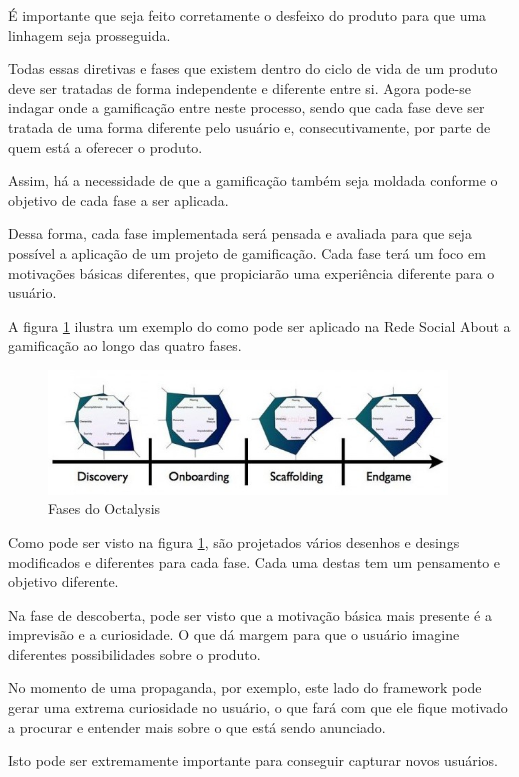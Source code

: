 É importante que seja feito corretamente o desfeixo do produto para que uma linhagem seja
prosseguida.


Todas essas diretivas e fases que existem dentro do ciclo de vida de um produto deve ser
tratadas de forma independente e diferente entre si. Agora pode-se indagar onde a gamificação
entre neste processo, sendo que cada fase deve ser tratada de uma forma diferente pelo
usuário e, consecutivamente, por parte de quem está a oferecer o produto.

Assim, há a necessidade de que a gamificação também seja moldada conforme o objetivo de
cada fase a ser aplicada.

Dessa forma, cada fase implementada será pensada e avaliada para que seja possível a
aplicação de um  projeto de gamificação. Cada fase terá um foco em motivações
básicas diferentes, que propiciarão uma experiência diferente para o usuário.

A figura \ref{fig:fasesoctalysis} ilustra um exemplo do como pode ser aplicado na
Rede Social About a gamificação ao longo das quatro fases.

\begin{figure}[h]
    \centering
    \includegraphics[width=400px, scale=1]{figuras/fasesoctalysis}
    \caption{Fases do Octalysis}
    \label{fig:fasesoctalysis}
\end{figure}

Como pode ser visto na figura \ref{fig:fasesoctalysis}, são projetados vários
desenhos e desings modificados e diferentes para cada fase. Cada uma destas
tem um pensamento e objetivo diferente.

Na fase de descoberta, pode ser visto que a motivação básica mais presente é
a imprevisão e a curiosidade. O que dá margem para que o usuário imagine diferentes
possibilidades sobre o produto. 

No momento de uma propaganda, por exemplo, este lado do framework pode gerar uma
extrema curiosidade no usuário, o que fará com que ele fique motivado a procurar
e entender mais sobre o que está sendo anunciado.

Isto pode ser extremamente importante para conseguir capturar novos usuários.


